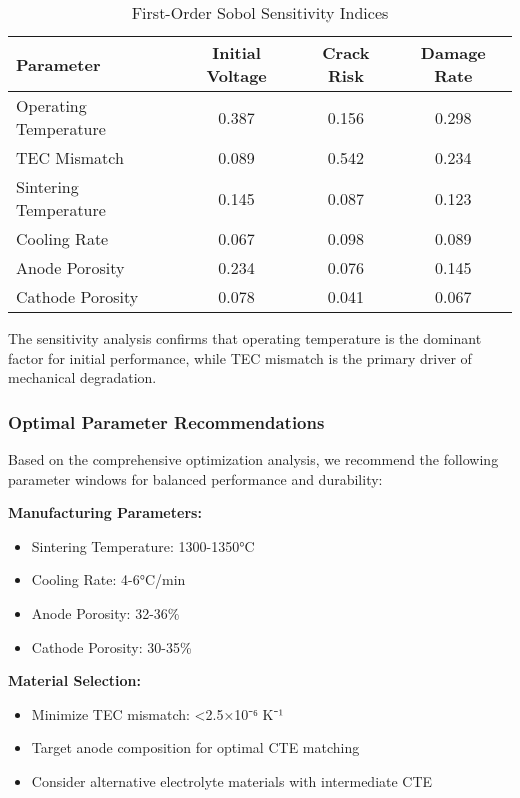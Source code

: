 \documentclass[conference]{IEEEtran}
\begin{document}
\begin{table}[H]
\centering
\caption{First-Order Sobol Sensitivity Indices}
\label{tab:sensitivity}
\begin{tabular}{@{}lccc@{}}
\toprule
\textbf{Parameter} & \textbf{Initial Voltage} & \textbf{Crack Risk} & \textbf{Damage Rate} \\
\midrule
Operating Temperature & 0.387 & 0.156 & 0.298 \\
TEC Mismatch & 0.089 & 0.542 & 0.234 \\
Sintering Temperature & 0.145 & 0.087 & 0.123 \\
Cooling Rate & 0.067 & 0.098 & 0.089 \\
Anode Porosity & 0.234 & 0.076 & 0.145 \\
Cathode Porosity & 0.078 & 0.041 & 0.067 \\
\bottomrule
\end{tabular}
\end{table}

The sensitivity analysis confirms that operating temperature is the dominant factor for initial performance, while TEC mismatch is the primary driver of mechanical degradation.

\subsubsection{Optimal Parameter Recommendations}

Based on the comprehensive optimization analysis, we recommend the following parameter windows for balanced performance and durability:

\textbf{Manufacturing Parameters:}
\begin{itemize}
\item Sintering Temperature: 1300-1350°C
\item Cooling Rate: 4-6°C/min
\item Anode Porosity: 32-36\%
\item Cathode Porosity: 30-35\%
\end{itemize}

\textbf{Material Selection:}
\begin{itemize}
\item Minimize TEC mismatch: <2.5×10⁻⁶ K⁻¹
\item Target anode composition for optimal CTE matching
\item Consider alternative electrolyte materials with intermediate CTE
\end{itemize}
\end{document}
